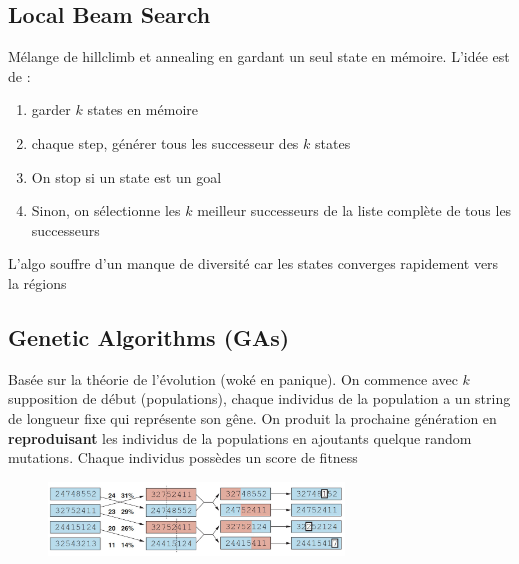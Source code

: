 		\begin{figure}[H]
			\centering
		\end{figure}
				
	\subsection{Local Beam Search}
		Mélange de hillclimb et annealing en gardant un seul state en mémoire. L'idée est de :
		\begin{enumerate}
			\item garder $k$ states en mémoire
			\item chaque step, générer tous les successeur des $k$ states
			\item On stop si un state est un goal
			\item Sinon, on sélectionne les $k$ meilleur successeurs de la liste complète de tous les successeurs
		\end{enumerate}
		
		L'algo souffre d'un manque de diversité car les states converges rapidement vers la  régions
		
	\subsection{Genetic Algorithms (GAs)}
		Basée sur la théorie de l'évolution (woké en panique). On commence avec $k$ supposition de début (populations), chaque individus  de la population a un string de longueur fixe qui représente son gêne. On produit la prochaine génération en \textbf{reproduisant} les individus de la populations en ajoutants quelque random mutations. Chaque individus possèdes un score de fitness
		
		\begin{figure}[H]
			\centering
			\includegraphics[width=0.7\textwidth]{img/GA}
		\end{figure}
	
